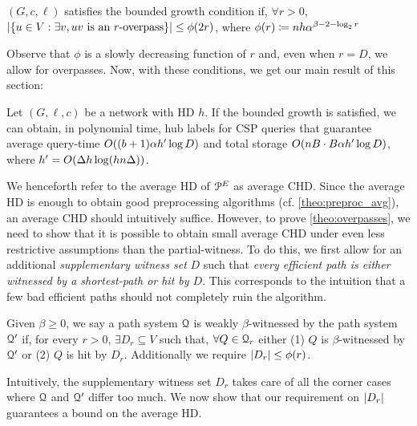 \begin{definition}
$(G,c,\ell)$ satisfies the bounded growth condition if, $\forall r>0$, $\lvert\{u\in V: \exists v, uv \text{ is an $r$-overpass}\}\rvert\leq \phi(2r)$, where $\phi(r)\coloneqq nh\alpha^{\beta-2-\log_2r}$
\end{definition}

Observe that $\phi$ is a slowly decreasing function of $r$ and, even when $r=D$, we allow for overpasses.
Now, with these conditions, we get our main result of this section:


\begin{theorem}\label{theo:overpasses}
Let $(G,\ell,c)$ be a network with HD $h$.
If the bounded growth is satisfied, we can obtain, in polynomial time, hub labels for CSP queries that guarantee average query-time $O((b+1)\alpha h'\log D)$ and total storage $O(nB\cdot B\alpha h'\log D)$, where $h'=O(\Delta h\log(hn\Delta))$.
\end{theorem}

We henceforth refer to the average HD of $\mathcal{P}^E$ as average CHD.
Since the average HD is enough to obtain good preprocessing algorithms (cf. \cref{theo:preproc_avg}), an average CHD should intuitively suffice.
However, to prove \cref{theo:overpasses}, we need to show that it is possible to obtain small average CHD under even less restrictive assumptions than the partial-witness.
To do this, we first allow for an additional \emph{supplementary witness set} $D$ such that \emph{every efficient path is either witnessed by a shortest-path or hit by $D$}.
This corresponds to the intuition that a few bad efficient paths should not completely ruin the algorithm. 

\begin{definition}
Given $\beta\geq 0$, we say a path system  $\mathcal{Q}$ is weakly $\beta$-witnessed by the path system $\mathcal{Q}'$ if, for every $r>0$, $\exists D_r\subseteq V$ such that, $\forall Q\in \mathcal{Q}_r$ either (1) $Q$ is $\beta$-witnessed by $\mathcal{Q}'$ or (2) $Q$ is hit by $D_r$.
Additionally we require $\lvert D_r\rvert\leq \phi(r)$.
\end{definition} 

Intuitively, the supplementary witness set $D_r$ takes care of all the corner cases where $\mathcal{Q}$ and $\mathcal{Q}'$ differ too much.
We now show that our requirement on $\lvert D_r\rvert$ guarantees a bound on the average HD.

